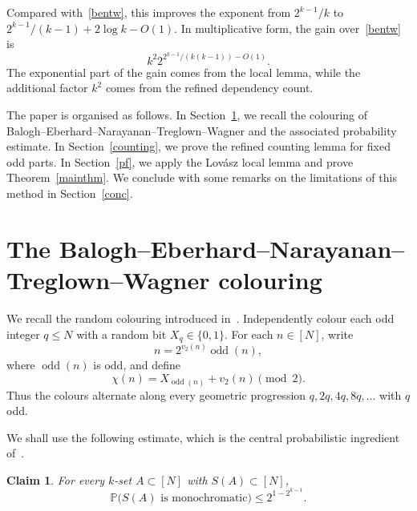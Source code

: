\documentclass[12pt,a4paper,english,reqno]{amsart}
\theoremstyle{plain}
\newtheorem{claim}[theorem]{Claim}
\theoremstyle{remark}
\DeclareMathOperator{\odd}{odd}
\begin{document}
Compared with~\eqref{bentw}, this improves the exponent from $2^{k-1}/k$ to $2^{k-1}/(k-1)+2\log k-O(1)$. In multiplicative form, the gain over~\eqref{bentw} is
\[
k^2 2^{2^{k-1}/(k(k-1))-O(1)}.
\]
The exponential part of the gain comes from the local lemma, while the additional factor $k^2$ comes from the refined dependency count.

The paper is organised as follows. In Section~\ref{colouring}, we recall the colouring of Balogh--Eberhard--Narayanan--Treglown--Wagner and the associated probability estimate. In Section~\ref{counting}, we prove the refined counting lemma for fixed odd parts. In Section~\ref{pf}, we apply the Lov\'{a}sz local lemma and prove Theorem~\ref{mainthm}. We conclude with some remarks on the limitations of this method in Section~\ref{conc}.

\section{The Balogh--Eberhard--Narayanan--Treglown--Wagner colouring}\label{colouring}

We recall the random colouring introduced in~\cite{BENTW}. Independently colour each odd integer $q\le N$ with a random bit $X_q\in\{0,1\}$. For each $n\in[N]$, write
\[
n=2^{v_2(n)}\odd(n),
\]
where $\odd(n)$ is odd, and define
\[
\chi(n)=X_{\odd(n)}+v_2(n)\pmod 2.
\]
Thus the colours alternate along every geometric progression $q,2q,4q,8q,\dots$ with $q$ odd.

We shall use the following estimate, which is the central probabilistic ingredient of~\cite{BENTW}.

\begin{claim}\label{probclaim}
For every $k$-set $A\subset [N]$ with $S(A)\subset [N]$,
\[
\mathbb P\big(S(A)\text{ is monochromatic}\big)\le 2^{1-2^{k-1}}.
\]
\end{claim}
\end{document}
